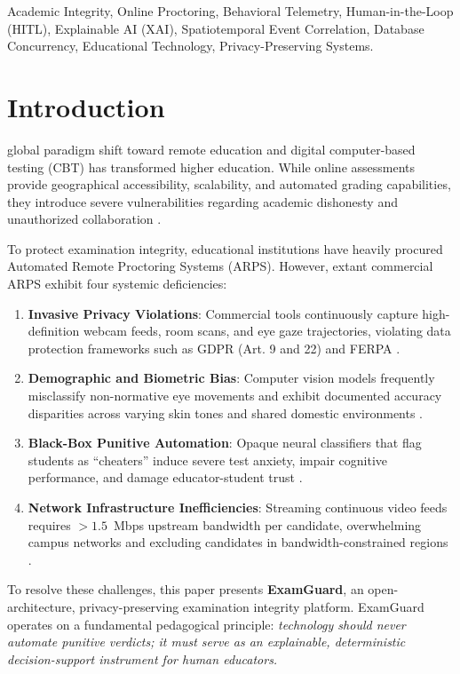 \documentclass[journal]{IEEEtran}
\begin{document}
\begin{IEEEkeywords}
Academic Integrity, Online Proctoring, Behavioral Telemetry, Human-in-the-Loop (HITL), Explainable AI (XAI), Spatiotemporal Event Correlation, Database Concurrency, Educational Technology, Privacy-Preserving Systems.
\end{IEEEkeywords}

\section{Introduction}
 global paradigm shift toward remote education and digital computer-based testing (CBT) has transformed higher education. While online assessments provide geographical accessibility, scalability, and automated grading capabilities, they introduce severe vulnerabilities regarding academic dishonesty and unauthorized collaboration \cite{lancaster2021, bretag2019}. 

To protect examination integrity, educational institutions have heavily procured Automated Remote Proctoring Systems (ARPS). However, extant commercial ARPS exhibit four systemic deficiencies:
\begin{enumerate}
    \item \textbf{Invasive Privacy Violations}: Commercial tools continuously capture high-definition webcam feeds, room scans, and eye gaze trajectories, violating data protection frameworks such as GDPR (Art. 9 and 22) and FERPA \cite{coghlan2021, jones2022}.
    \item \textbf{Demographic and Biometric Bias}: Computer vision models frequently misclassify non-normative eye movements and exhibit documented accuracy disparities across varying skin tones and shared domestic environments \cite{buolamwini2018}.
    \item \textbf{Black-Box Punitive Automation}: Opaque neural classifiers that flag students as ``cheaters'' induce severe test anxiety, impair cognitive performance, and damage educator-student trust \cite{swauger2020}.
    \item \textbf{Network Infrastructure Inefficiencies}: Streaming continuous video feeds requires $>1.5$~Mbps upstream bandwidth per candidate, overwhelming campus networks and excluding candidates in bandwidth-constrained regions \cite{baber2021}.
\end{enumerate}

To resolve these challenges, this paper presents \textbf{ExamGuard}, an open-architecture, privacy-preserving examination integrity platform. ExamGuard operates on a fundamental pedagogical principle: \emph{technology should never automate punitive verdicts; it must serve as an explainable, deterministic decision-support instrument for human educators.}
\end{document}
